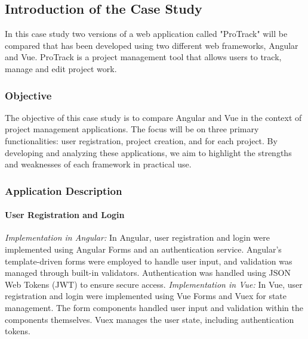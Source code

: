 \documentclass[conference]{IEEEtran}
\begin{document}

\subsection{Introduction of the Case Study}
In this case study two versions of a web application called "ProTrack" will be compared that has been developed using two different web frameworks, Angular and Vue. ProTrack is a project management tool that allows users to track, manage and edit project work.
\subsubsection{Objective}
The objective of this case study is to compare Angular and Vue in the context of project management applications. The focus will be on three primary functionalities: user registration, project creation, and  for each project. By developing and analyzing these applications, we aim to highlight the strengths and weaknesses of each framework in practical use.
\subsubsection{Application Description}
\paragraph{User Registration and Login}
\textit{Implementation in Angular: }In Angular, user registration and login were implemented using Angular Forms and an authentication service. Angular's template-driven forms were employed to handle user input, and validation was managed through built-in validators. Authentication was handled using JSON Web Tokens (JWT) to ensure secure access.\newline
\newline\textit{Implementation in Vue: }In Vue, user registration and login were implemented using Vue Forms and Vuex for state management. The form components handled user input and validation within the components themselves. Vuex manages the user state, including authentication tokens.
\end{document}
